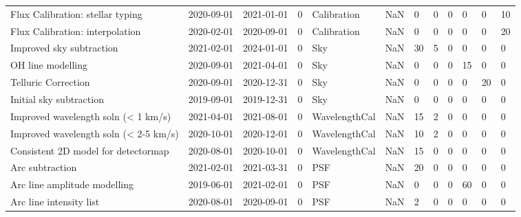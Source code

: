 \begin{longtable}{llllp{2cm}llllll}
            Flux Calibration: stellar typing &  2020-09-01 &  2021-01-01 &         0 &    Calibration &                      NaN &      0 &       0 &        0 &       0 &     0 &         10 \\
             Flux Calibration: interpolation &  2020-02-01 &  2020-09-01 &         0 &    Calibration &                      NaN &      0 &       0 &        0 &       0 &     0 &         20 \\
                    Improved sky subtraction &  2021-02-01 &  2024-01-01 &         0 &            Sky &                      NaN &     30 &       5 &        0 &       0 &     0 &          0 \\
                           OH line modelling &  2020-09-01 &  2021-04-01 &         0 &            Sky &                      NaN &      0 &       0 &        0 &      15 &     0 &          0 \\
                         Telluric Correction &  2020-09-01 &  2020-12-31 &         0 &            Sky &                      NaN &      0 &       0 &        0 &       0 &    20 &          0 \\
                     Initial sky subtraction &  2019-09-01 &  2019-12-31 &         0 &            Sky &                      NaN &      0 &       0 &        0 &       0 &     0 &          0 \\
         Improved wavelength soln (< 1 km/s) &  2021-04-01 &  2021-08-01 &         0 &  WavelengthCal &                      NaN &     15 &       2 &        0 &       0 &     0 &          0 \\
       Improved wavelength soln (< 2-5 km/s) &  2020-10-01 &  2020-12-01 &         0 &  WavelengthCal &                      NaN &     10 &       2 &        0 &       0 &     0 &          0 \\
         Consistent 2D model for detectormap &  2020-08-01 &  2020-10-01 &         0 &  WavelengthCal &                      NaN &     15 &       0 &        0 &       0 &     0 &          0 \\
                             Arc subtraction &  2021-02-01 &  2021-03-31 &         0 &            PSF &                      NaN &     20 &       0 &        0 &       0 &     0 &          0 \\
                Arc line amplitude modelling &  2019-06-01 &  2021-02-01 &         0 &            PSF &                      NaN &      0 &       0 &        0 &      60 &     0 &          0 \\
                     Arc line intensity list &  2020-08-01 &  2020-09-01 &         0 &            PSF &                      NaN &      2 &       0 &        0 &       0 &     0 &          0 \\

\end{longtable}

